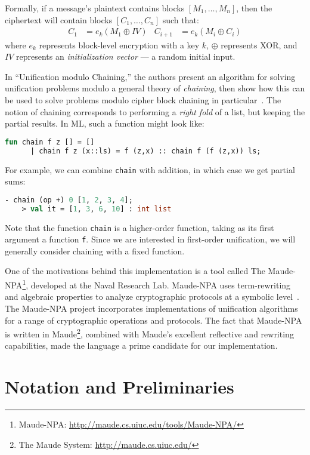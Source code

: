 \documentclass[11pt,twoside,titlepage]{article}
\begin{document}
Formally, if a message's plaintext contains blocks $[M_1, \dotsc, M_n]$, then
the ciphertext will contain blocks $[C_1, \dotsc, C_n]$ such that:
\begin{align*}
    C_1 &= e_k(M_1 \oplus IV) &
    C_{i+1} &= e_k(M_i \oplus C_i)
\end{align*}
where $e_k$ represents block-level encryption with a key $k$, $\oplus$
represents XOR, and $IV$ represents an \emph{initialization vector} --- a
random initial input.

In ``Unification modulo Chaining,'' the authors present an algorithm for
solving unification problems modulo a general theory of \emph{chaining}, then
show how this can be used to solve problems modulo cipher block chaining in
particular~\cite{anantharaman2012unification}. The notion of chaining
corresponds to performing a \emph{right fold} of a list, but keeping the
partial results.  In ML, such a function might look like:
\begin{lstlisting}[language=ML, style=smalllisting]
    fun chain f z [] = []
      | chain f z (x::ls) = f (z,x) :: chain f (f (z,x)) ls;
\end{lstlisting}
For example, we can combine \lstinline|chain| with addition, in which case we
get partial sums:
\begin{lstlisting}[language=ML, style=smalllisting]
    - chain (op +) 0 [1, 2, 3, 4];
    > val it = [1, 3, 6, 10] : int list
\end{lstlisting}
Note that the function \lstinline|chain| is a higher-order function, taking as
its first argument a function \lstinline|f|. Since we are interested in
first-order unification, we will generally consider chaining with a fixed
function.

One of the motivations behind this implementation is a tool called The
Maude-NPA\footnote{Maude-NPA: \url{http://maude.cs.uiuc.edu/tools/Maude-NPA/}},
developed at the Naval Research Lab. Maude-NPA uses term-rewriting and
algebraic properties to analyze cryptographic protocols at a symbolic
level~\cite{escobar2009maude}.  The Maude-NPA project incorporates
implementations of unification algorithms for a range of cryptographic
operations and protocols. The fact that Maude-NPA is written in
Maude\footnote{The Maude System: \url{http://maude.cs.uiuc.edu/}}, combined
with Maude's excellent reflective and rewriting capabilities, made the language
a prime candidate for our implementation.

\section{Notation and Preliminaries}\label{section:notation}
\end{document}
